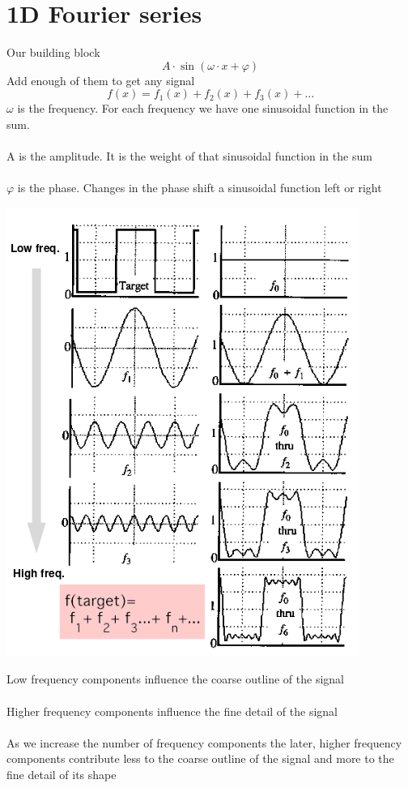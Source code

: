\documentclass{article}[18pt]
\begin{document}
\section{1D Fourier series}
Our building block
$$A\cdot \sin(\omega \cdot x + \varphi)$$
Add enough of them to get any signal
$$f(x)=f_1(x)+f_2(x)+f_3(x)+\ldots$$
$\omega$ is the frequency. For each frequency we have one sinusoidal function in the sum.\\
\\
A is the amplitude. It is the weight of that sinusoidal function in the sum\\
\\
$\varphi$ is the phase. Changes in the phase shift a sinusoidal function left or right
\begin{center}
	\includegraphics[scale=0.7]{"1D Fourier"}
\end{center}
Low frequency components influence the coarse outline of the signal\\
\\
Higher frequency components influence the fine detail of the signal\\
\\
As we increase the number of frequency components the later, higher frequency components contribute less to the coarse outline of the signal and more to the fine detail of its shape
\end{document}
